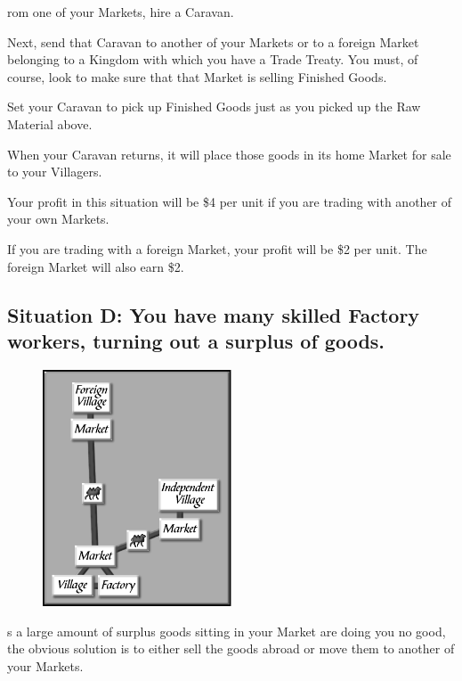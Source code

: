 rom one of your Markets, hire a Caravan.

Next, send that Caravan to another of your Markets or to a foreign Market belonging to a Kingdom with which you have a Trade Treaty. You must, of course, look to make sure that that Market is selling Finished Goods.

Set your Caravan to pick up Finished Goods just as you picked up the Raw Material above.

When your Caravan returns, it will place those goods in its home Market for sale to your Villagers.

Your profit in this situation will be \$4 per unit if you are trading with another of your own Markets.

If you are trading with a foreign Market, your profit will be \$2 per unit. The foreign Market will also earn \$2.

\subsection{\textsf{Situation D: You have many skilled Factory workers, turning out a surplus of goods.}}

\begin{figure}
    \vspace{-20pt}
    \begin{center}
        \includegraphics[width=0.5\textwidth]{Itradesit4} %
    \end{center}
    \vspace{-20pt}
\end{figure}

s a large amount of surplus goods sitting in your Market are doing you no good, the obvious solution is to either sell the goods abroad or move them to another of your Markets.

